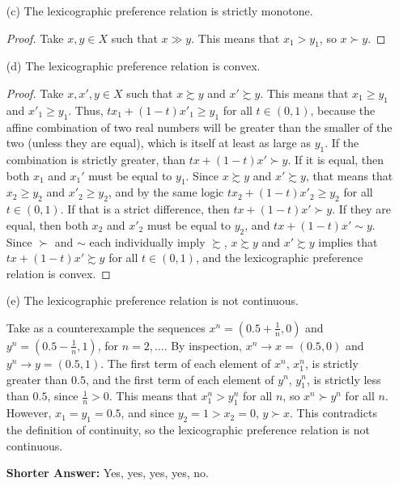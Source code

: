 \documentclass[12pt]{article}
\begin{document}
\begin{itemize}
    \item[(c)] The lexicographic preference relation is strictly monotone.

    \begin{proof}
        Take $x,y \in X$ such that $x \gg y$. This means that $x_1 > y_1$, so $x \succ y$.
    \end{proof}

    \item[(d)] The lexicographic preference relation is convex.

    \begin{proof}
        Take $x,x',y \in X$ such that $x \succsim y$ and $x' \succsim y$. This means that $x_1 \ge y_1$ and $x'_1 \ge y_1$. Thus, $tx_1 + (1-t)x'_1 \ge y_1$ for all $t \in (0,1)$, because the affine combination of two real numbers will be greater than the smaller of the two (unless they are equal), which is itself at least as large as $y_1$. If the combination is strictly greater, than $tx + (1-t)x' \succ y$. If it is equal, then both $x_1$ and $x_1'$ must be equal to $y_1$. Since $x \succsim y$ and $x' \succsim y$, that means that $x_2 \ge y_2$ and $x'_2 \ge y_2$, and by the same logic $tx_2 + (1-t)x'_2 \ge y_2$ for all $t \in (0,1)$. If that is a strict difference, then $tx + (1-t)x' \succ y$. If they are equal, then both $x_2$ and $x'_2$ must be equal to $y_2$, and $tx + (1-t)x' \sim y$. Since $\succ$ and $\sim$ each individually imply $\succsim$, $x \succsim y$ and $x' \succsim y$ implies that  $tx + (1-t)x' \succsim y$ for all $t \in (0,1)$, and the lexicographic preference relation is convex.
    \end{proof}

    \item[(e)] The lexicographic preference relation is not continuous.

    \smallskip
    
    Take as a counterexample the sequences $x^n = (0.5 + \frac{1}{n},0)$ and $y^n = (0.5 - \frac{1}{n},1)$, for $n = 2,\dots$. By inspection, $x^n \to x = (0.5,0)$ and $y^n \to y = (0.5,1)$. The first term of each element of $x^n$, $x^n_1$, is strictly greater than $0.5$, and the first term of each element of $y^n$, $y^n_1$, is strictly less than $0.5$, since $\frac{1}{n} > 0$. This means that $x^n_1 > y^n_1$ for all $n$, so $x^n \succ y^n$ for all $n$. However, $x_1 = y_1 = 0.5$, and since $y_2 = 1 > x_2 = 0$, $y \succ x$. This contradicts the definition of continuity, so the lexicographic preference relation is not continuous.

    \bigskip

    \textbf{Shorter Answer:} Yes, yes, yes, yes, no.

    
\end{itemize}
\end{document}
